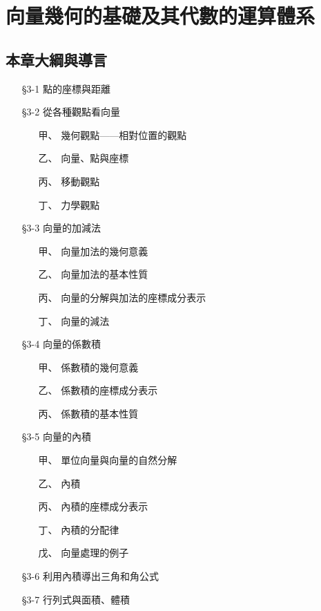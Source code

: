 
\section{向量幾何的基礎及其代數的運算體系}
\label{sec:b3s-ch3}

\subsection*{本章大綱與導言}

\begin{itemize}[leftmargin=3em]
  \item[§3-1] 點的座標與距離
  \item[§3-2] 從各種觀點看向量
    \begin{itemize}[leftmargin=2em]
      \item[甲、] 幾何觀點——相對位置的觀點
      \item[乙、] 向量、點與座標
      \item[丙、] 移動觀點
      \item[丁、] 力學觀點
    \end{itemize}
  \item[§3-3] 向量的加減法
    \begin{itemize}[leftmargin=2em]
      \item[甲、] 向量加法的幾何意義
      \item[乙、] 向量加法的基本性質
      \item[丙、] 向量的分解與加法的座標成分表示
      \item[丁、] 向量的減法
    \end{itemize}
  \item[§3-4] 向量的係數積
    \begin{itemize}[leftmargin=2em]
      \item[甲、] 係數積的幾何意義
      \item[乙、] 係數積的座標成分表示
      \item[丙、] 係數積的基本性質
    \end{itemize}
  \item[§3-5] 向量的內積
    \begin{itemize}[leftmargin=2em]
      \item[甲、] 單位向量與向量的自然分解
      \item[乙、] 內積
      \item[丙、] 內積的座標成分表示
      \item[丁、] 內積的分配律
      \item[戊、] 向量處理的例子
    \end{itemize}
  \item[§3-6] 利用內積導出三角和角公式
  \item[§3-7] 行列式與面積、體積
\end{itemize}


